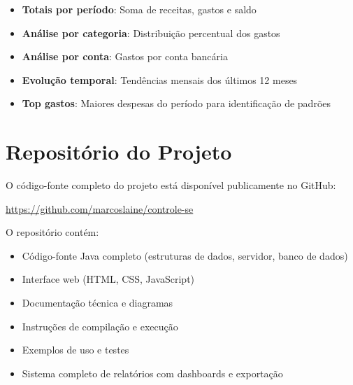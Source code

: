 \documentclass[12pt,a4paper]{article}
\begin{document}
\begin{itemize}
  \item \textbf{Totais por período}: Soma de receitas, gastos e saldo
  \item \textbf{Análise por categoria}: Distribuição percentual dos gastos
  \item \textbf{Análise por conta}: Gastos por conta bancária
  \item \textbf{Evolução temporal}: Tendências mensais dos últimos 12 meses
  \item \textbf{Top gastos}: Maiores despesas do período para identificação de padrões
\end{itemize}

\section{Repositório do Projeto}

O código-fonte completo do projeto está disponível publicamente no GitHub:

\begin{center}
\url{https://github.com/marcoslaine/controle-se}
\end{center}

\noindent O repositório contém:
\begin{itemize}
  \item Código-fonte Java completo (estruturas de dados, servidor, banco de dados)
  \item Interface web (HTML, CSS, JavaScript)
  \item Documentação técnica e diagramas
  \item Instruções de compilação e execução
  \item Exemplos de uso e testes
  \item Sistema completo de relatórios com dashboards e exportação
\end{itemize}
\end{document}

